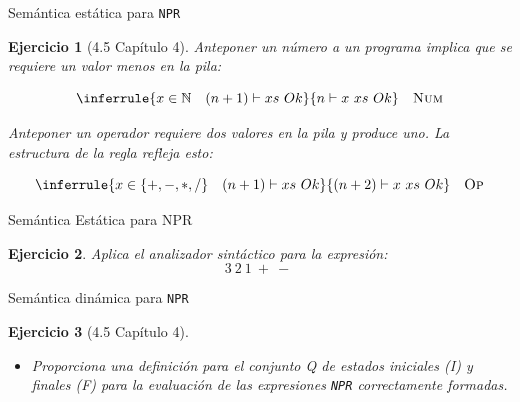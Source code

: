\documentclass[11pt]{beamer}
\newtheorem{exercise}{Ejercicio}
\begin{document}
\begin{frame}{Semántica estática para  \texttt{NPR}}
	\begin{exercise}[4.5 Capítulo 4] 
		
		Anteponer un número a un programa implica que se requiere un valor menos en la pila:
		
		\[
		\inferrule{x \in \mathbb{N} \quad (n+1) \vdash xs \ Ok}{n \vdash x\ xs \ Ok} \quad \textsc{Num}
		\]
		
		\medskip
		
		Anteponer un operador requiere dos valores en la pila y produce uno. La estructura de la regla refleja esto:
		
		\[
		\inferrule{x \in \{+,-,*,/\} \quad (n+1) \vdash xs \ Ok}{(n+2) \vdash x\ xs \ Ok} \quad \textsc{Op}
		\]
	\end{exercise}
\end{frame}

\begin{frame}{Semántica Estática para NPR}
	
	\begin{exercise}
		
		Aplica el analizador sintáctico para la expresión: 
		\[
			 3\ 2\ 1\ +\ -\
		\]
		
		\centering
	\end{exercise}
	
\end{frame}


\begin{frame}{Semántica dinámica para  \texttt{NPR}}
	\begin{exercise}[4.5 Capítulo 4]
		\begin{itemize}
			\item Proporciona una definición para el conjunto \textit{Q} de estados iniciales (\textit{I}) y finales (\textit{F}) para la evaluación de las expresiones \texttt{NPR} correctamente formadas.
		\end{itemize}
	\end{exercise}	
\end{frame}
\end{document}
